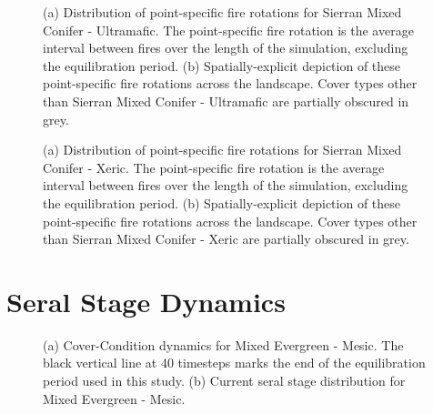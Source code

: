 \begin{figure}[!htbp]
  \centering
  \caption{(a) Distribution of point-specific fire rotations for Sierran Mixed Conifer - Ultramafic. The point-specific fire rotation is the average interval between fires over the length of the simulation, excluding the equilibration period. (b) Spatially-explicit depiction of these point-specific fire rotations across the landscape. Cover types other than Sierran Mixed Conifer - Ultramafic are partially obscured in grey.}
\label{fig:preturn_smcu}
\end{figure}

\begin{figure}[!htbp]
  \centering
  \caption{(a) Distribution of point-specific fire rotations for Sierran Mixed Conifer - Xeric. The point-specific fire rotation is the average interval between fires over the length of the simulation, excluding the equilibration period. (b) Spatially-explicit depiction of these point-specific fire rotations across the landscape. Cover types other than Sierran Mixed Conifer - Xeric are partially obscured in grey.}
\label{fig:preturn_smcx_app}
\end{figure}

\clearpage

\section{Seral Stage Dynamics}
\label{app:sec:seraldynamics}

\begin{figure}[!htbp]
  \centering
  \caption{(a) Cover-Condition dynamics for Mixed Evergreen - Mesic. The black vertical line at 40 timesteps marks the end of the equilibration period used in this study. (b) Current seral stage distribution for Mixed Evergreen - Mesic.}
\label{fig:covcond_megm}
\end{figure}

